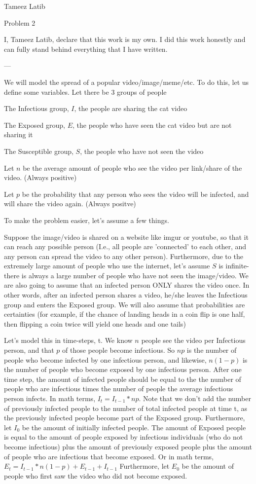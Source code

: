 \documentclass{article}
\begin{document}
Tameez Latib

Problem 2

I, Tameez Latib, declare that this work is my own. I did this work honestly and can fully stand behind everything that I have written.

---

We will model the spread of a popular video/image/meme/etc. To do this, let us define some variables. Let there be 3 groups of people

The Infectious group, $I$, the people are sharing the cat video

The Exposed group, $E$, the people who have seen the cat video but are not sharing it

The Susceptible group, $S$, the people who have not seen the video

Let $n$ be the average amount of people who see the video per link/share of the video. (Always positive)

Let $p$ be the probability that any person who sees the video will be infected, and will share the video again. (Always positve)

To make the problem easier, let's assume a few things. 

Suppose the image/video is shared on a website like imgur or youtube, so that it can reach any possible person (I.e., all people are 'connected' to each other, and any person can spread the video to any other person). Furthermore, due to the extremely large amount of people who use the internet, let's assume $S$ is infinite- there is always a large number of people who have not seen the image/video. We are also going to assume that an infected person ONLY shares the video once. In other words, after an infected person shares a video, he/she leaves the Infectious group and enters the Exposed group. We will also assume that probabilities are certainties (for example, if the chance of landing heads in a coin flip is one half, then flipping a coin twice will yield one heads and one tails)

Let's model this in time-steps, t. We know $n$ people see the video per Infectious person, and that $p$ of those people become infectious. So $np$ is the number of people who become infected by one infectious person, and likewise, $n(1-p)$ is the number of people who become exposed by one infectious person. 
After one time step, the amount of infected people should be equal to the the number of people who are infectious times the number of people the average infectious person infects. In math terms, $I_{t}=I_{t-1}*np$. Note that we don't add the number of previously infected people to the number of total infected people at time t, as the previously infected people become part of the Exposed group. Furthermore, let $I_{0}$ be the amount of initially infected people. The amount of Exposed people is equal to the amount of people exposed by infectious individuals (who do not become infectious) plus the amount of previously exposed people plus the amount of people who are infectious that become exposed. Or in math terms, $E_t=I_{t-1}*n(1-p)+E_{t-1}+I_{t-1}$ Furthermore, let $E_0$ be the amount of people who first saw the video who did not become exposed. 
\end{document}
